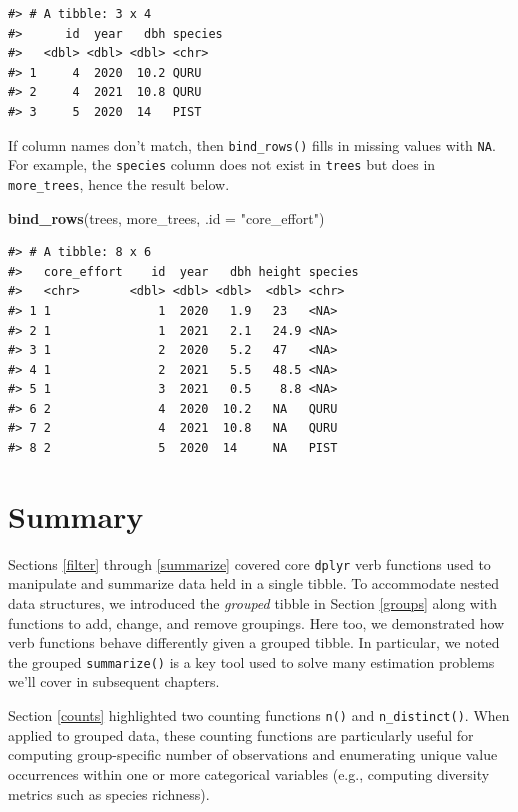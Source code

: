 \documentclass[
  11pt,
]{krantz}
\newenvironment{Shaded}{\begin{snugshade}}{\end{snugshade}}
\newcommand{\DataTypeTok}[1]{\textcolor[rgb]{0.13,0.29,0.53}{#1}}
\newcommand{\KeywordTok}[1]{\textcolor[rgb]{0.13,0.29,0.53}{\textbf{#1}}}
\newcommand{\NormalTok}[1]{#1}
\newcommand{\StringTok}[1]{\textcolor[rgb]{0.31,0.60,0.02}{#1}}
\theoremstyle{definition}
\theoremstyle{definition}
\theoremstyle{definition}
\theoremstyle{definition}
\theoremstyle{remark}
\begin{document}
\begin{verbatim}
#> # A tibble: 3 x 4
#>      id  year   dbh species
#>   <dbl> <dbl> <dbl> <chr>  
#> 1     4  2020  10.2 QURU   
#> 2     4  2021  10.8 QURU   
#> 3     5  2020  14   PIST
\end{verbatim}

If column names don't match, then \texttt{bind\_rows()} fills in missing values with \texttt{NA}. For example, the \texttt{species} column does not exist in \texttt{trees} but does in \texttt{more\_trees}, hence the result below.

\begin{Shaded}
\begin{Highlighting}[]
\KeywordTok{bind\_rows}\NormalTok{(trees, more\_trees, }\DataTypeTok{.id =} \StringTok{"core\_effort"}\NormalTok{)}
\end{Highlighting}
\end{Shaded}

\begin{verbatim}
#> # A tibble: 8 x 6
#>   core_effort    id  year   dbh height species
#>   <chr>       <dbl> <dbl> <dbl>  <dbl> <chr>  
#> 1 1               1  2020   1.9   23   <NA>   
#> 2 1               1  2021   2.1   24.9 <NA>   
#> 3 1               2  2020   5.2   47   <NA>   
#> 4 1               2  2021   5.5   48.5 <NA>   
#> 5 1               3  2021   0.5    8.8 <NA>   
#> 6 2               4  2020  10.2   NA   QURU   
#> 7 2               4  2021  10.8   NA   QURU   
#> 8 2               5  2020  14     NA   PIST
\end{verbatim}

\hypertarget{summaryDplyr}{%
\section{Summary}\label{summaryDplyr}}

Sections \ref{filter} through \ref{summarize} covered core \texttt{dplyr} verb functions used to manipulate and summarize data held in a single tibble. To accommodate nested data structures, we introduced the \emph{grouped} tibble in Section \ref{groups} along with functions to add, change, and remove groupings. Here too, we demonstrated how verb functions behave differently given a grouped tibble. In particular, we noted the grouped \texttt{summarize()} is a key tool used to solve many estimation problems we'll cover in subsequent chapters.

Section \ref{counts} highlighted two counting functions \texttt{n()} and \texttt{n\_distinct()}. When applied to grouped data, these counting functions are particularly useful for computing group-specific number of observations and enumerating unique value occurrences within one or more categorical variables (e.g., computing diversity metrics such as species richness).
\end{document}

